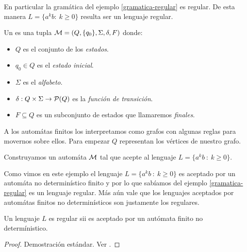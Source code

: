 \documentclass[tesis.tex]{subfiles}
\begin{document}
En particular la gramática del ejemplo \ref{gramatica-regular} es regular. 
De esta manera $L= \{ a^k b : \ k \ge 0  \}$ resulta ser un lenguaje regular.


\begin{deff}
	Un  es una tupla ${\cal M} = (Q,\{q_0\},\Sigma,\delta,F)$ donde:
	\begin{itemize}
	\item $Q$ es el conjunto de los \emph{estados}.
	\item $q_0 \in Q$ es el \emph{estado inicial}.
	\item $\Sigma$ es el \emph{alfabeto}.
	\item $\delta:Q \times \Sigma \to {\cal P}(Q)$ es la \emph{función de transición}.
	\item $F \subseteq Q$ es un subconjunto de estados que llamaremos \emph{finales}.
	\end{itemize}
\end{deff}

A los automátas finitos los interpretamos como grafos con algunas reglas para movernos sobre ellos. 
Para empezar $Q$ representan los vértices de nuestro grafo.

\begin{ej}
	Construyamos un automáta $\cal M$ tal que acepte al lenguaje $L = \{ a^{k}b \ : \ k \ge 0  \}$.
\end{ej}


Como vimos en este ejemplo el lenguaje $L = \{ a^kb \ : \ k \ge 0  \}$ es aceptado por un automáta no determinístico finito y por lo que sabíamos del ejemplo \ref{gramatica-regular} es un lenguaje regular.
Más aún vale que los lenguajes aceptados por automátas finitos no determinísticos son justamente los regulares.

\begin{teo}
 Un lenguaje $L$ es regular sii es aceptado por un autómata finito no determínistico.
\end{teo}

\begin{proof}
	Demostración estándar. Ver \cite{hopcraft-ullman}.
\end{proof}




\end{document}
